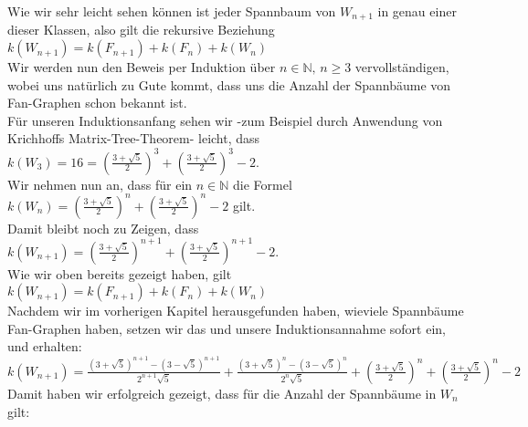 Wie wir sehr leicht sehen können ist jeder Spannbaum von $W_{n+1}$ in genau einer dieser Klassen, also gilt die rekursive Beziehung
$\mathit{k}(W_{n+1}) = \mathit{k}(F_{n+1}) + \mathit{k}(F_n) + \mathit{k}(W_n)$\\
Wir werden nun den Beweis per Induktion über $n \in \mathbb{N}, \, n \geq 3$ vervollständigen, wobei uns natürlich zu Gute kommt, dass uns die Anzahl der Spannbäume von Fan-Graphen schon bekannt ist.\\
Für unseren Induktionsanfang sehen wir -zum Beispiel durch Anwendung von Krichhoffs Matrix-Tree-Theorem- leicht, dass $\mathit{k}(W_3) = 16 = (\frac{3+\sqrt{5}}{2})^3+(\frac{3+\sqrt{5}}{2})^3-2$.\\
Wir nehmen nun an, dass für ein $n \in \mathbb{N}$ die Formel $\mathit{k}(W_n) = (\frac{3+\sqrt{5}}{2})^n+(\frac{3+\sqrt{5}}{2})^n-2$ gilt.\\
Damit bleibt noch zu Zeigen, dass  $\mathit{k}(W_{n+1}) = (\frac{3+\sqrt{5}}{2})^{n+1}+(\frac{3+\sqrt{5}}{2})^{n+1}-2$.\\
Wie wir oben bereits gezeigt haben, gilt
$\mathit{k}(W_{n+1}) = \mathit{k}(F_{n+1}) + \mathit{k}(F_n) + \mathit{k}(W_n)$\\
Nachdem wir im vorherigen Kapitel herausgefunden haben, wieviele Spannbäume Fan-Graphen haben, setzen wir das und unsere Induktionsannahme sofort ein, und erhalten:\\
$\mathit{k}(W_{n+1}) = \frac{(3+\sqrt{5})^{n+1}-(3-\sqrt{5})^{n+1}}{2^{n+1}\sqrt{5}} + \frac{(3+\sqrt{5})^{n}-(3-\sqrt{5})^{n}}{2^{n}\sqrt{5}} + (\frac{3+\sqrt{5}}{2})^n+(\frac{3+\sqrt{5}}{2})^n-2$\\
Damit haben wir erfolgreich gezeigt, dass für die Anzahl der Spannbäume in $W_n$ gilt:\\


